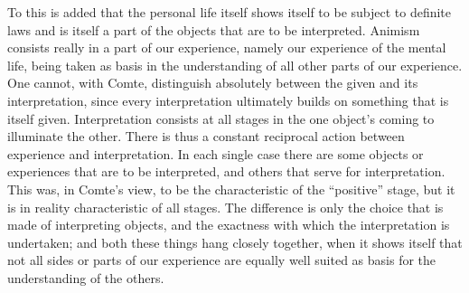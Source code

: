 \documentclass[12pt,a4paper]{book}
\newcommand{\opage}[1]{\marginnote{\footnotesize\textit{[#1]}}}
\begin{document}
To this is added that the personal life itself shows itself to be subject
to definite laws and is itself a part of the objects that are to be
interpreted. Animism consists really in a part of our experience, namely
our experience of the mental life, being taken as basis in the
understanding of all other parts of our experience. One cannot, with Comte,
distinguish absolutely between the given and its interpretation, since every
interpretation ultimately builds on something that is itself given.
Interpretation consists at all stages in the one object's coming to
illuminate the other. There is thus a constant reciprocal action between
experience and \opage{118}interpretation. In each single case there are some objects
or experiences that are to be interpreted, and others that serve for
interpretation. This was, in Comte's view, to be the characteristic of the
``positive'' stage, but it is in reality characteristic of all stages. The
difference is only the choice that is made of interpreting objects, and the
exactness with which the interpretation is undertaken; and both these
things hang closely together, when it shows itself that not all sides or
parts of our experience are equally well suited as basis for the
understanding of the others.
\end{document}
